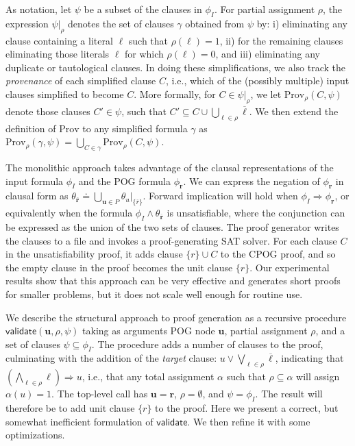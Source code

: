 \documentclass[letterpaper,USenglish,cleveref, autoref, thm-restate]{lipics-v2021}
\newcommand{\obar}[1]{\overline{#1}}
\newcommand{\lit}{\ell}
\newcommand{\imply}{\Rightarrow}
\newcommand{\assign}{\alpha}
\newcommand{\passign}{\rho}
\newcommand{\validate}{\textsf{validate}}
\newcommand{\prov}{\textrm{Prov}}
\newcommand{\inputformula}{\phi_I}
\newcommand{\makenode}[1]{\mathbf{#1}}
\newcommand{\nodeu}{\makenode{u}}
\newcommand{\noder}{\makenode{r}}
\newcommand{\simplify}[2]{#1|_{#2}}
\begin{document}
As notation,
let $\psi$ be a subset of the clauses in $\inputformula$.
For partial assignment
$\passign$, the expression  $\simplify{\psi}{\passign}$ denotes the set of clauses $\gamma$
obtained from $\psi$ by: i) eliminating any
clause containing a literal $\lit$ such that $\passign(\lit) = 1$,
ii) for the remaining clauses eliminating those literals $\lit$ for
which $\passign(\lit) = 0$, and iii) eliminating any duplicate or tautological clauses.
In doing these simplifications, we also track the \emph{provenance}
of each simplified clause $C$, i.e., which of the (possibly multiple) input clauses simplified to become $C$.
More formally, for $C \in \simplify{\psi}{\passign}$, we let $\prov_{\passign}(C, \psi)$ denote
those clauses $C' \in \psi$, such that
$C' \subseteq C \cup \bigcup_{\lit \in \passign} \obar{\lit}$.
We then extend the definition of $\prov$ to any simplified formula
$\gamma$ as $\prov_{\passign}(\gamma, \psi) = \bigcup_{C \in \gamma} \prov_{\passign}(C, \psi)$.

The monolithic approach
takes advantage of the clausal representations of
the input formula $\inputformula$ and the POG formula $\phi_\noder$.
We can express the negation of $\phi_\noder$ in clausal form as
$\theta_{\obar{\noder}} \doteq \bigcup_{\nodeu\in P} \simplify{\theta_{u}}{\{\obar{r}\}}$.
Forward implication will hold when $\inputformula \imply \phi_\noder$, or  equivalently
when the formula $\inputformula \land \theta_{\obar{\noder}}$
is unsatisfiable, where the
conjunction can be expressed as the union
of the two sets of clauses.  The proof generator writes the clauses to a file and invokes a proof-generating SAT solver.
For each clause $C$ in the unsatisfiability proof, it adds clause $\{r\} \cup C$ to the CPOG proof, and so the empty clause in the proof becomes the unit clause $\{r\}$.
Our experimental results show
that this approach can be very effective and generates short proofs
for smaller problems, but it does not scale well enough for routine
use.


We describe the structural approach to proof generation as a recursive procedure
$\validate(\nodeu, \passign, \psi)$ taking as arguments POG
node $\nodeu$, partial assignment
$\passign$, and a set of clauses $\psi \subseteq \inputformula$.
The procedure adds a number of clauses to the proof, culminating with
the addition of the \emph{target} clause:
$u \lor \bigvee_{\lit \in \passign} \obar{\lit}$, indicating
that $(\bigwedge_{\lit \in \passign} \lit) \imply u$, i.e.,
that any total
assignment $\assign$ such that $\passign \subseteq \assign$
will assign $\assign(u) = 1$.
The top-level call has $\nodeu = \noder$, $\passign = \emptyset$, and $\psi = \inputformula$.
The result will therefore be to add unit clause $\{r\}$ to the proof.
Here we present a correct, but somewhat inefficient formulation of
$\validate$.  We then refine it with some optimizations.
\end{document}

